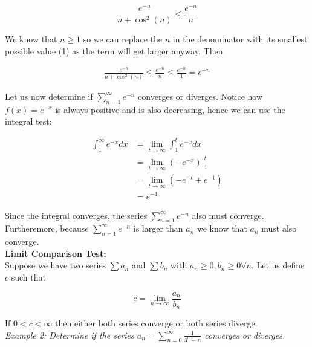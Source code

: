         \begin{equation*}
            \frac{e^{-n}}{n+\cos^2{(n)}}    \leq \frac{e^{-n}}{n}
        \end{equation*}

        \noindent We know that $n\geq 1$ so we can replace the $n$ in the denominator with its
        smallest possible value (1) as the term will get larger anyway. Then

        \begin{align*}
            \frac{e^{-n}}{n+\cos^2{(n)}}  \leq \frac{e^{-n}}{n} \leq \frac{e^{-n}}{1}=e^{-n}
        \end{align*}

        \noindent Let us now determine if $\sum^\infty_{n=1}e^{-n}$ converges or diverges. Notice
        how $f(x)=e^{-x}$ is always positive and is also decreasing, hence we can use the integral
        test:

        \begin{align*}
            \int^\infty_1 e^{-x}dx  &= \lim_{t\to\infty}\int^t_1 e^{-x}dx \\
                                    &= \lim_{t\to\infty}\left(-e^{-x}\right)\Big|^t_1 \\
                                    &= \lim_{t\to\infty}\left(-e^{-t}+e^{-1}\right) \\
                                    &= e^{-1}
        \end{align*}

        \noindent Since the integral converges, the series $\sum^\infty_{n=1}e^{-n}$ also must
        converge. Furtheremore, because $\sum^\infty_{n=1}e^{-n}$ is larger than $a_n$ we know that
        $a_n$ must also converge. \\

        \pagebreak
        \noindent \color{purple} \textbf{Limit Comparison Test:} \color{black} \\
        \noindent Suppose we have two series $\sum a_n$ and $\sum b_n$ with $a_n\geq 0,b_n\geq0\forall n$.
        Let us define $c$ such that

        \begin{equation*}
            c = \lim_{n\to\infty} \frac{a_n}{b_n}
        \end{equation*}

        \noindent If $0<c<\infty$ then either both series converge or both series diverge. \\

        \noindent \color{blue} \textit{Example 2: Determine if the series $a_n=\sum^\infty_{n=0}
        \frac{1}{3^n-n}$ converges or diverges.} \color{black} \\


